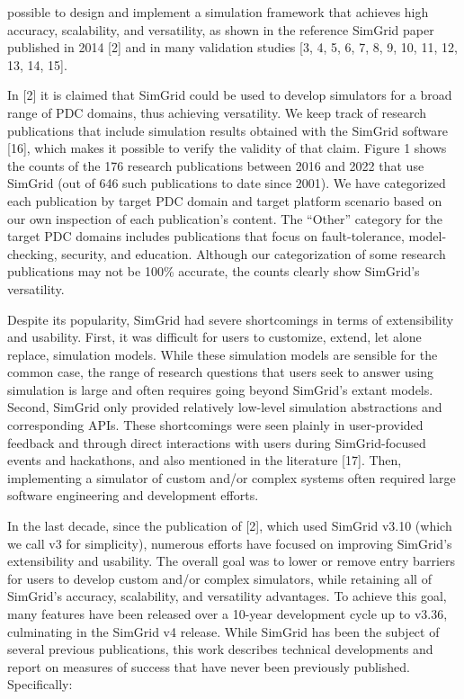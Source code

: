 \documentclass[
]{article}
\begin{document}
possible to design and implement a simulation framework that achieves
high accuracy, scalability, and versatility, as shown in the reference
SimGrid paper published in 2014 {[}2{]} and in many validation studies
{[}3, 4, 5, 6, 7, 8, 9, 10, 11, 12, 13, 14, 15{]}.

In {[}2{]} it is claimed that SimGrid could be used to develop
simulators for a broad range of PDC domains, thus achieving versatility.
We keep track of research publications that include simulation results
obtained with the SimGrid software {[}16{]}, which makes it possible to
verify the validity of that claim. Figure 1 shows the counts of the 176
research publications between 2016 and 2022 that use SimGrid (out of 646
such publications to date since 2001). We have categorized each
publication by target PDC domain and target platform scenario based on
our own inspection of each publication's content. The ``Other'' category
for the target PDC domains includes publications that focus on
fault-tolerance, model-checking, security, and education. Although our
categorization of some research publications may not be 100\% accurate,
the counts clearly show SimGrid's versatility.

Despite its popularity, SimGrid had severe shortcomings in terms of
extensibility and usability. First, it was difficult for users to
customize, extend, let alone replace, simulation models. While these
simulation models are sensible for the common case, the range of
research questions that users seek to answer using simulation is large
and often requires going beyond SimGrid's extant models. Second, SimGrid
only provided relatively low-level simulation abstractions and
corresponding APIs. These shortcomings were seen plainly in
user-provided feedback and through direct interactions with users during
SimGrid-focused events and hackathons, and also mentioned in the
literature {[}17{]}. Then, implementing a simulator of custom and/or
complex systems often required large software engineering and
development efforts.

In the last decade, since the publication of {[}2{]}, which used SimGrid
v3.10 (which we call v3 for simplicity), numerous efforts have focused
on improving SimGrid's extensibility and usability. The overall goal was
to lower or remove entry barriers for users to develop custom and/or
complex simulators, while retaining all of SimGrid's accuracy,
scalability, and versatility advantages. To achieve this goal, many
features have been released over a 10-year development cycle up to
v3.36, culminating in the SimGrid v4 release. While SimGrid has been the
subject of several previous publications, this work describes technical
developments and report on measures of success that have never been
previously published. Specifically:
\end{document}
